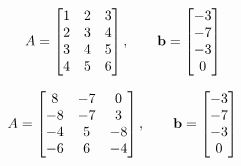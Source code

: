 \begin{oppgave}
\begin{punkt}
\vspace{-10pt}
$$A=
\begin{bmatrix}
1 & 2 & 3\\
2 & 3 & 4\\
3 & 4 & 5\\
4 & 5 & 6
\end{bmatrix},
\qquad
\mathbf{b}=
\begin{bmatrix}
-3  \\
-7 \\
-3 \\
0
\end{bmatrix}
$$
\end{punkt}


\begin{punkt}
\vspace{-10pt}
	$$A=
	\begin{bmatrix}
	8  & -7 & 0 \\
	-8 & -7 & 3 \\
	-4 & 5  & -8\\
	-6 & 6  & -4
	\end{bmatrix},
\qquad
        \mathbf{b}=
	\begin{bmatrix}
	-3  \\
	-7 \\
	-3 \\
	0
	\end{bmatrix}
	$$
	
\end{punkt}

\end{oppgave}


